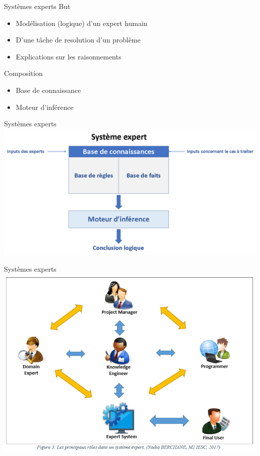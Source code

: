 \documentclass{beamer}
\begin{document}
\begin{frame}{Systèmes experts}
	But
	\begin{itemize}
		\item Modélisation (logique) d'un expert humain 
		\item D'une t\^ache de resolution d'un problème
		\item Explications sur les raisonnements
	\end{itemize}
	Composition
	\begin{itemize}
		\item Base de connaissance
		\item Moteur d'inférence
	\end{itemize}
\end{frame}

\begin{frame}{Systèmes experts}
	\centering
	\includegraphics[width=\linewidth]{sysexpert.png}
\end{frame}

\begin{frame}{Systèmes experts}
	\centering
	\includegraphics[width=0.95\linewidth]{se.png}
\end{frame}
\end{document}
